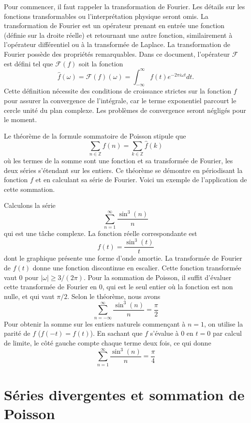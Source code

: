 \documentclass[12pt,a4paper]{article}
\begin{document}
Pour commencer, il faut rappeler la transformation de Fourier. Les détails sur les fonctions transformables ou l'interprétation physique seront omis. La transformation de Fourier est un opérateur prenant en entrée une fonction (définie sur la droite réelle) et retournant une autre fonction, similairement à l'opérateur différentiel ou à la transformée de Laplace. La transformation de Fourier possède des propriétés remarquables. Dans ce document, l'opérateur $\mathcal{F}$ est défini tel que $\mathcal{F}(f)$ soit la fonction
\[ \hat{f}(\omega) = \mathcal{F}(f)(\omega) = \int_{-\infty}^{\infty} f(t)e^{-2\pi i\omega t} dt. \]
Cette définition nécessite des conditions de croissance strictes sur la fonction $f$ pour assurer la convergence de l'intégrale, car le terme exponentiel parcourt le cercle unité du plan complexe. Les problèmes de convergence seront négligés pour le moment.

Le théorème de la formule sommatoire de Poisson stipule que
\[ \sum_{n\in\mathbb{Z}} f(n) = \sum_{k\in\mathbb{Z}} \hat{f}(k) \]
où les termes de la somme sont une fonction et sa transformée de Fourier, les deux séries s'étendant sur les entiers. Ce théorème se démontre en périodisant la fonction $f$ et en calculant sa série de Fourier. Voici un exemple de l'application de cette sommation.

Calculons la série
\[ \sum_{n=1}^{\infty} \frac{\sin^3(n)}{n} \]
qui est une tâche complexe. La fonction réelle correspondante est
\[ f(t) = \frac{\sin^3(t)}{t} \]
dont le graphique présente une forme d'onde amortie. La transformée de Fourier de $f(t)$ donne une fonction discontinue en escalier. Cette fonction transformée vaut $0$ pour $|\omega|\ge 3/(2\pi)$. Pour la sommation de Poisson, il suffit d'évaluer cette transformée de Fourier en $0$, qui est le seul entier où la fonction est non nulle, et qui vaut $\pi/2$. Selon le théorème, nous avons
\[ \sum_{n=-\infty}^{\infty} \frac{\sin^3(n)}{n} = \frac{\pi}{2} \]
Pour obtenir la somme sur les entiers naturels commençant à $n=1$, on utilise la parité de $f$ ($f(-t) = f(t)$). En sachant que $f$ s'évalue à $0$ en $t=0$ par calcul de limite, le côté gauche compte chaque terme deux fois, ce qui donne
\[ \sum_{n=1}^{\infty} \frac{\sin^3(n)}{n} = \frac{\pi}{4} \]

\section*{Séries divergentes et sommation de Poisson}
\end{document}
